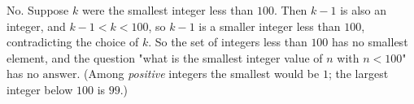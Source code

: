 No. Suppose $k$ were the smallest integer less than $100$. Then $k-1$ is also an integer, and $k-1<k<100$, so $k-1$ is a smaller integer less than $100$, contradicting the choice of $k$. So the set of integers less than $100$ has no smallest element, and the question "what is the smallest integer value of $n$ with $n<100$" has $\boxed{\text{no answer}}$. (Among \emph{positive} integers the smallest would be $1$; the largest integer below $100$ is $99$.)
